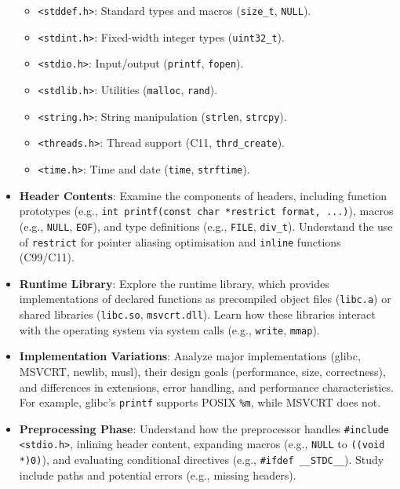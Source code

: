 \documentclass[a4paper,12pt]{article}
\begin{document}
\begin{itemize}[noitemsep]
\begin{itemize}
        \item \texttt{<stddef.h>}: Standard types and macros (\texttt{size\_t}, \texttt{NULL}).
        \item \texttt{<stdint.h>}: Fixed-width integer types (\texttt{uint32\_t}).
        \item \texttt{<stdio.h>}: Input/output (\texttt{printf}, \texttt{fopen}).
        \item \texttt{<stdlib.h>}: Utilities (\texttt{malloc}, \texttt{rand}).
        \item \texttt{<string.h>}: String manipulation (\texttt{strlen}, \texttt{strcpy}).
        \item \texttt{<threads.h>}: Thread support (C11, \texttt{thrd\_create}).
        \item \texttt{<time.h>}: Time and date (\texttt{time}, \texttt{strftime}).
    \end{itemize}

    \item \textbf{Header Contents}: Examine the components of headers, including function prototypes (e.g., \texttt{int printf(const char *restrict format, ...)}), macros (e.g., \texttt{NULL}, \texttt{EOF}), and type definitions (e.g., \texttt{FILE}, \texttt{div\_t}). Understand the use of \texttt{restrict} for pointer aliasing optimisation and \texttt{inline} functions (C99/C11).

    \item \textbf{Runtime Library}: Explore the runtime library, which provides implementations of declared functions as precompiled object files (\texttt{libc.a}) or shared libraries (\texttt{libc.so}, \texttt{msvcrt.dll}). Learn how these libraries interact with the operating system via system calls (e.g., \texttt{write}, \texttt{mmap}).

    \item \textbf{Implementation Variations}: Analyze major implementations (glibc, MSVCRT, newlib, musl), their design goals (performance, size, correctness), and differences in extensions, error handling, and performance characteristics. For example, glibc’s \texttt{printf} supports POSIX \texttt{\%m}, while MSVCRT does not.

    \item \textbf{Preprocessing Phase}: Understand how the preprocessor handles \texttt{\#include <stdio.h>}, inlining header content, expanding macros (e.g., \texttt{NULL} to \texttt{((void *)0)}), and evaluating conditional directives (e.g., \texttt{\#ifdef \_\_STDC\_\_}). Study include paths and potential errors (e.g., missing headers).


\end{itemize}
\end{document}
